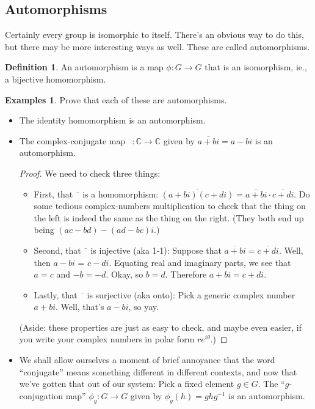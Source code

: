 \documentclass[12pt]{article}
\theoremstyle{definition} %
\newtheorem*{definition}{Definition}
\newtheorem*{example}{Examples}
\newcommand{\Alert}[1]{\textcolor{xRed}{#1}}
\newcommand{\C}{\mathbb{C}}
\newcommand\inv{^{-1}} %
\begin{document}
\subsection*{Automorphisms}
Certainly every group is isomorphic to itself. There's an obvious way to do this, but there may be more interesting ways as well. These are called \Alert{automorphisms}.

\begin{definition}
    An \Alert{automorphism} is a map $\phi:G\to G$ that is an isomorphism, ie., a bijective homomorphism.
\end{definition}

\begin{example} Prove that each of these are automorphisms.
    \begin{itemize}
        \item The identity homomorphism is an automorphism.
        \item The complex-conjugate map $\overline{\phantom{z}}:\C \to \C$ given by $\overline{a+bi} = a - bi$ is an automorphism.
        \begin{proof}
            We need to check three things:
            \begin{itemize}
                \item First, that $\overline{\phantom{z}}$ is a homomorphism: $\overline{(a+bi)(c+di)} = \overline{a+bi} \cdot \overline{c+di}$. Do some tedious complex-numbers multiplication to check that the thing on the left is indeed the same as the thing on the right. (They both end up being $(ac-bd)-(ad-bc)i$.)
                \item Second, that $\overline{\phantom{z}}$ is injective (aka 1-1): Suppose that $\overline{a+bi} = \overline{c+di}$. Well, then $a-bi$ = $c-di$. Equating real and imaginary parts, we see that $a=c$ and $-b = -d$. Okay, so $b=d$. Therefore $a+bi = c+di$.
                \item Lastly, that $\overline{\phantom{z}}$ is surjective (aka onto): Pick a generic complex number $a+bi$. Well, that's $\overline{a-bi}$, so yay.
            \end{itemize}
            (Aside: these properties are just as easy to check, and maybe even easier, if you write your complex numbers in polar form $re^{i\theta}$.)
        \end{proof}
        \item We shall allow ourselves a moment of brief annoyance that the word ``conjugate'' means something different in different contexts, and now that we've gotten that out of our system: Pick a fixed element $g\in G$. The ``$g$-conjugation map'' $\phi_g:G\to G$ given by $\phi_g(h) = ghg\inv$ is an automorphism.

\end{itemize}
\end{example}
\end{document}
